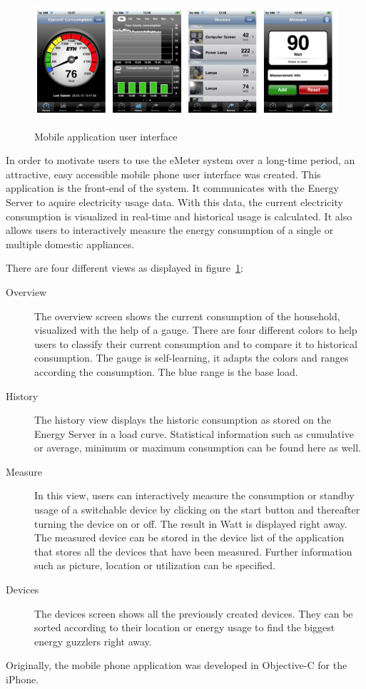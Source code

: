 \begin{center}
\begin{figure}
 \includegraphics[width=16cm]{Images/iphone_screens.png}
 \label{iphone_screens}
 \caption{Mobile application user interface}
\end{figure}
\end{center}
In order to motivate users to use the eMeter system over a long-time period, an attractive, easy accessible mobile phone user interface was created. This application is the front-end of the system. It communicates with the Energy Server to aquire electricity usage data.
With this data, the current electricity consumption is visualized in real-time and historical usage is calculated. It also allows users to interactively measure the energy consumption of a single or multiple domestic appliances. 

There are four different views as displayed in figure~\ref{iphone_screens}:

\begin{description}
 \item[Overview] The overview screen shows the current consumption of the household, visualized with the help of a gauge. There are four different colors to help users to classify their current consumption and to compare it to historical consumption. The gauge is self-learning, it adapts the colors and ranges according the consumption. The blue range is the base load.
 \item[History] The history view displays the historic consumption as stored on the Energy Server in a load curve. Statistical information such as cumulative or average, minimum or maximum consumption can be found here as well.
 \item[Measure] In this view, users can interactively measure the consumption or standby usage of a switchable device by clicking on the start button and thereafter turning the device on or off. The result in Watt is displayed right away. The measured device can be stored in the device list of the application that stores all the devices that have been measured. Further information such as picture, location or utilization can be specified.
 \item[Devices] The devices screen shows all the previously created devices. They can be sorted according to their location or energy usage to find the biggest energy guzzlers right away.   
\end{description}
Originally, the mobile phone application was developed in Objective-C for the iPhone.

